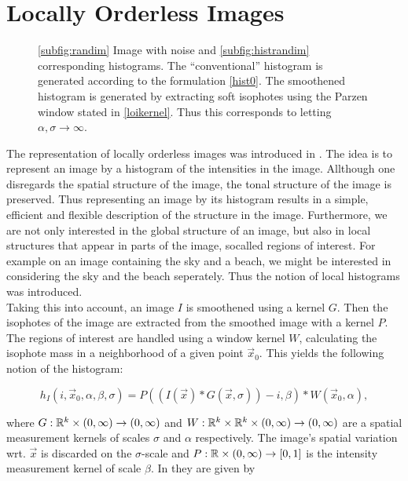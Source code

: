 \section{Locally Orderless Images}
\begin{figure}
  \centering
  \quad
  \caption{\ref{subfig:randim} Image with noise and \ref{subfig:histrandim} corresponding histograms. The ``conventional'' histogram is generated according to the formulation \eqref{hist0}. The smoothened histogram is generated by extracting soft isophotes using the Parzen window stated in \eqref{loikernel}. Thus this corresponds to letting $\alpha,\sigma\to\infty$.}\label{fig:HistRandIm}
\end{figure}

The representation of locally orderless images was introduced in \cite{koe.99}. The idea is to represent an image by a histogram of the intensities in the image. Allthough one disregards the spatial structure of the image, the tonal structure of the image is preserved. Thus representing an image by its histogram results in a simple, efficient and flexible description of the structure in the image. Furthermore, we are not only interested in the global structure of an image, but also in local structures that appear in parts of the image, socalled regions of interest. For example on an image containing the sky and a beach, we might be interested in considering the sky and the beach seperately. Thus the notion of local histograms was introduced.\\

Taking this into account, an image $I$ is smoothened using a kernel $G$. Then the isophotes of the image are extracted from the smoothed image with a kernel $P$.\\
The regions of interest are handled using a window kernel $W$, calculating the isophote mass in a neighborhood of a given point $\vec{x}_0$. This yields the following notion of the histogram:

\begin{equation}
  h_I(i,\vec{x}_0,\alpha,\beta,\sigma) = P((I(\vec{x})*G(\vec{x},\sigma))-i,\beta)*W(\vec{x}_0,\alpha),
\end{equation}

where $G:\mathbb R^k\times (0,\infty)\to (0,\infty)$ and $W:\mathbb R^k\times \mathbb R^k\times (0,\infty)\to (0,\infty)$ are a spatial measurement kernels of scales $\sigma$ and $\alpha$ respectively. The image's spatial variation wrt. $\vec{x}$ is discarded on the $\sigma$-scale and $P:\mathbb R\times(0,\infty)\to [0,1]$ is the intensity measurement kernel of scale $\beta$. In \cite{koe.99} they are given by

